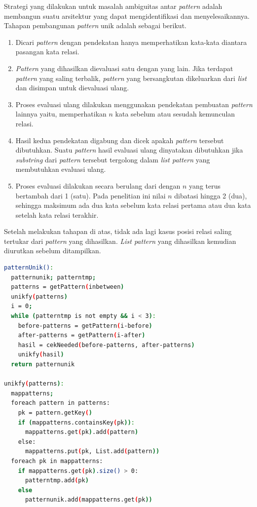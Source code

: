 Strategi yang dilakukan untuk masalah ambiguitas antar \textit{pattern} adalah membangun suatu arsitektur yang dapat mengidentifikasi dan menyelesaikannya. Tahapan pembangunan \textit{pattern} unik adalah sebagai berikut.
\begin{enumerate}
  \item Dicari \textit{pattern} dengan pendekatan hanya memperhatikan kata-kata diantara pasangan kata relasi.
  \item \textit{Pattern} yang dihasilkan dievaluasi satu dengan yang lain. Jika terdapat \textit{pattern} yang saling terbalik, \textit{pattern} yang bersangkutan dikeluarkan dari \textit{list} dan disimpan untuk dievaluasi ulang.
  \item Proses evaluasi ulang dilakukan menggunakan pendekatan pembuatan \textit{pattern} lainnya yaitu, memperhatikan $n$ kata sebelum atau sesudah kemunculan relasi.
  \item Hasil kedua pendekatan digabung dan dicek apakah \textit{pattern} tersebut dibutuhkan. Suatu \textit{pattern} hasil evaluasi ulang dinyatakan dibutuhkan jika \textit{substring} dari \textit{pattern} tersebut tergolong dalam \textit{list pattern} yang membutuhkan evaluasi ulang.
  \item Proses evaluasi dilakukan secara berulang dari dengan $n$ yang terus bertambah dari 1 (satu). Pada penelitian ini nilai $n$ dibatasi hingga 2 (dua), sehingga maksimum ada dua kata sebelum kata relasi pertama atau dua kata setelah kata relasi terakhir.
\end{enumerate}

Setelah melakukan tahapan di atas, tidak ada lagi kasus posisi relasi saling tertukar dari \textit{pattern} yang dihasilkan. \textit{List pattern} yang dihasilkan kemudian diurutkan sebelum ditampilkan.
\begin{lstlisting}[caption={Algoritme pembentukan \textit{pattern unik}}, language=bash]
patternUnik():
  patternunik; patterntmp;
  patterns = getPattern(inbetween)
  unikfy(patterns)
  i = 0;
  while (patterntmp is not empty && i < 3):
    before-patterns = getPattern(i-before)
    after-patterns = getPattern(i-after)
    hasil = cekNeeded(before-patterns, after-patterns)
    unikfy(hasil)
  return patternunik

unikfy(patterns):
  mappatterns;
  foreach pattern in patterns:
    pk = pattern.getKey()
    if (mappatterns.containsKey(pk)):
      mappatterns.get(pk).add(pattern)
    else:
      mappatterns.put(pk, List.add(pattern))
  foreach pk in mappatterns:
    if mappatterns.get(pk).size() > 0:
      patterntmp.add(pk)
    else 
      patternunik.add(mappatterns.get(pk))
\end{lstlisting}


